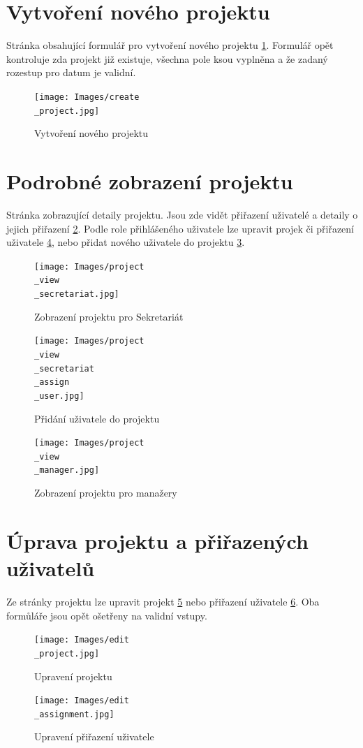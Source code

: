 \documentclass[czech,P5]{thesiskiv}
\begin{document}
\section{Vytvoření nového projektu}
Stránka obsahující formulář pro vytvoření nového projektu \ref{fig:createproject}. Formulář opět kontroluje zda projekt již existuje, všechna pole ksou vyplněna a že zadaný rozestup pro datum je validní.
 \begin{figure}[H]
	\centering
	\texttt{[image: Images/create\\\_project.jpg]}
	\caption{Vytvoření nového projektu}
	\label{fig:createproject} 
\end{figure}
\newpage

\section{Podrobné zobrazení projektu}
Stránka zobrazující detaily projektu. Jsou zde vidět přiřazení uživatelé a detaily o jejich přiřazení \ref{fig:viewProjectSec}. Podle role přihlášeného uživatele lze upravit projek či přiřazení uživatele \ref{fig:viewProjectMan}, nebo přidat nového uživatele do projektu \ref{fig:viewProjectAdd}. 
 \begin{figure}[H]
	\centering
	\texttt{[image: Images/project\\\_view\\\_secretariat.jpg]}
	\caption{Zobrazení projektu pro Sekretariát}
	\label{fig:viewProjectSec} 
\end{figure}
 \begin{figure}[H]
	\centering
	\texttt{[image: Images/project\\\_view\\\_secretariat\\\_assign\\\_user.jpg]}
	\caption{Přidání uživatele do projektu}
	\label{fig:viewProjectAdd} 
\end{figure}
 \begin{figure}[H]
	\centering
	\texttt{[image: Images/project\\\_view\\\_manager.jpg]}
	\caption{Zobrazení projektu pro manažery}
	\label{fig:viewProjectMan} 
\end{figure}

\section{Úprava projektu a přiřazených uživatelů}
Ze stránky projektu lze upravit projekt \ref{fig:editProject} nebo přiřazení uživatele \ref{fig:editAssignment}. Oba formůláře jsou opět ošetřeny na validní vstupy.  
 \begin{figure}[H]
	\centering
	\texttt{[image: Images/edit\\\_project.jpg]}
	\caption{Upravení projektu}
	\label{fig:editProject} 
\end{figure}
 \begin{figure}[H]
	\centering
	\texttt{[image: Images/edit\\\_assignment.jpg]}
	\caption{Upravení přiřazení uživatele}
	\label{fig:editAssignment} 
\end{figure}
\newpage
\end{document}
